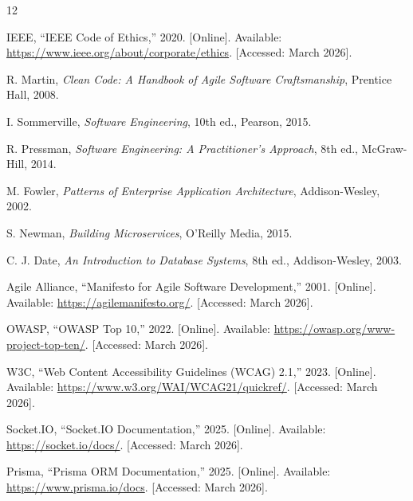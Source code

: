 \documentclass[12pt,a4paper,oneside]{report}
\begin{document}
\clearpage

\setcounter{page}{1}












\clearpage
\begin{thebibliography}{12}

IEEE, ``IEEE Code of Ethics,'' 2020. [Online]. Available: \url{https://www.ieee.org/about/corporate/ethics}. [Accessed: March 2026].

R. Martin, \textit{Clean Code: A Handbook of Agile Software Craftsmanship}, Prentice Hall, 2008.

I. Sommerville, \textit{Software Engineering}, 10th ed., Pearson, 2015.

R. Pressman, \textit{Software Engineering: A Practitioner's Approach}, 8th ed., McGraw-Hill, 2014.

M. Fowler, \textit{Patterns of Enterprise Application Architecture}, Addison-Wesley, 2002.

S. Newman, \textit{Building Microservices}, O'Reilly Media, 2015.

C. J. Date, \textit{An Introduction to Database Systems}, 8th ed., Addison-Wesley, 2003.

Agile Alliance, ``Manifesto for Agile Software Development,'' 2001. [Online]. Available: \url{https://agilemanifesto.org/}. [Accessed: March 2026].

OWASP, ``OWASP Top 10,'' 2022. [Online]. Available: \url{https://owasp.org/www-project-top-ten/}. [Accessed: March 2026].

W3C, ``Web Content Accessibility Guidelines (WCAG) 2.1,'' 2023. [Online]. Available: \url{https://www.w3.org/WAI/WCAG21/quickref/}. [Accessed: March 2026].

Socket.IO, ``Socket.IO Documentation,'' 2025. [Online]. Available: \url{https://socket.io/docs/}. [Accessed: March 2026].

Prisma, ``Prisma ORM Documentation,'' 2025. [Online]. Available: \url{https://www.prisma.io/docs}. [Accessed: March 2026].

\end{thebibliography}

\appendix



\end{document}
